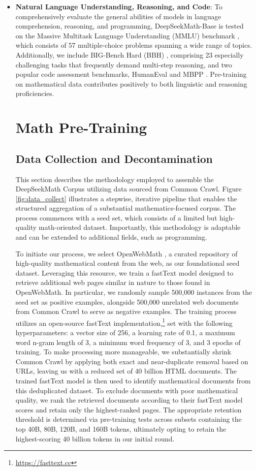 \begin{itemize}[topsep=0pt]
\item \textbf{Natural Language Understanding, Reasoning, and Code}: To comprehensively evaluate the general abilities of models in language comprehension, reasoning, and programming, DeepSeekMath-Base is tested on the Massive Multitask Language Understanding (MMLU) benchmark \citep{mmlu}, which consists of 57 multiple-choice problems spanning a wide range of topics. Additionally, we include BIG-Bench Hard (BBH) \citep{bbh}, comprising 23 especially challenging tasks that frequently demand multi-step reasoning, and two popular code assessment benchmarks, HumanEval \citep{codex} and MBPP \citep{mbpp}. Pre-training on mathematical data contributes positively to both linguistic and reasoning proficiencies.

\section{Math Pre-Training}

\subsection{Data Collection and Decontamination} This section describes the methodology employed to assemble the DeepSeekMath Corpus utilizing data sourced from Common Crawl. Figure \ref{fig:data_collect} illustrates a stepwise, iterative pipeline that enables the structured aggregation of a substantial mathematics-focused corpus. The process commences with a seed set, which consists of a limited but high-quality math-oriented dataset. Importantly, this methodology is adaptable and can be extended to additional fields, such as programming.

To initiate our process, we select OpenWebMath \citep{openwebmath}, a curated repository of high-quality mathematical content from the web, as our foundational seed dataset. Leveraging this resource, we train a fastText model \citep{joulin2016fasttext} designed to retrieve additional web pages similar in nature to those found in OpenWebMath. In particular, we randomly sample 500,000 instances from the seed set as positive examples, alongside 500,000 unrelated web documents from Common Crawl to serve as negative examples. The training process utilizes an open-source fastText implementation,\footnote{\url{https://fasttext.cc}} set with the following hyperparameters: a vector size of 256, a learning rate of 0.1, a maximum word n-gram length of 3, a minimum word frequency of 3, and 3 epochs of training. To make processing more manageable, we substantially shrink Common Crawl by applying both exact and near-duplicate removal based on URLs, leaving us with a reduced set of 40 billion HTML documents. The trained fastText model is then used to identify mathematical documents from this deduplicated dataset. To exclude documents with poor mathematical quality, we rank the retrieved documents according to their fastText model scores and retain only the highest-ranked pages. The appropriate retention threshold is determined via pre-training tests across subsets containing the top 40B, 80B, 120B, and 160B tokens, ultimately opting to retain the highest-scoring 40 billion tokens in our initial round.


\end{itemize}
